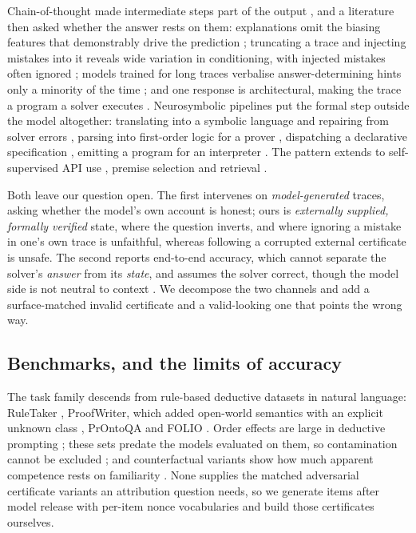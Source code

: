 \documentclass[10pt]{article}
\begin{document}
Chain-of-thought made intermediate steps part of the output
\citep{wei2022chainofthought}, and a literature then asked whether the answer
rests on them: explanations omit the biasing features that demonstrably drive the
prediction \citep{turpin2023language}; truncating a trace and injecting mistakes
into it reveals wide variation in conditioning, with injected mistakes often
ignored \citep{lanham2023measuring,arcuschin2025chainofthought}; models trained
for long traces verbalise answer-determining hints only a minority of the time
\citep{chen2025reasoning}; and one response is architectural, making the trace a
program a solver executes \citep{lyu2023faithful}. Neurosymbolic pipelines put
the formal step outside the model altogether: translating into a symbolic language and repairing from solver errors \citep{pan2023logiclm}, parsing into
first-order logic for a prover \citep{olausson2023linc}, dispatching a
declarative specification \citep{ye2023satlm}, emitting a program for an interpreter
\citep{gao2022pal}. The pattern extends to self-supervised API
use \citep{schick2023toolformer}, premise selection \citep{yang2023leandojo} and
retrieval \citep{lewis2020retrievalaugmented}.

Both leave our question open. The first intervenes on \emph{model-generated}
traces, asking whether the model's own account is honest; ours is
\emph{externally supplied, formally verified} state, where the question inverts, and where ignoring a mistake in one's own trace is unfaithful, whereas
following a corrupted external certificate is unsafe. The second reports
end-to-end accuracy, which cannot separate the solver's \emph{answer} from its
\emph{state}, and assumes the solver correct, though the model side is not
neutral to context \citep{shi2023large,xie2023adaptive}. We decompose the two
channels and add a surface-matched invalid certificate and a valid-looking one
that points the wrong way.

\subsection{Benchmarks, and the limits of accuracy}

The task family descends from rule-based deductive datasets in natural language:
RuleTaker \citep{clark2020transformers}, ProofWriter, which added open-world
semantics with an explicit unknown class \citep{tafjord2020proofwriter}, PrOntoQA
\citep{saparov2022language} and FOLIO \citep{han2022folio}. Order effects are
large in deductive prompting \citep{chen2024premise}; these sets predate the
models evaluated on them, so contamination cannot be excluded
\citep{deng2024investigating,golchin2023time}; and counterfactual variants show
how much apparent competence rests on familiarity \citep{wu2023reasoning}. None
supplies the matched adversarial certificate variants an attribution question
needs, so we generate items after model release with per-item nonce vocabularies
and build those certificates ourselves.
\end{document}
